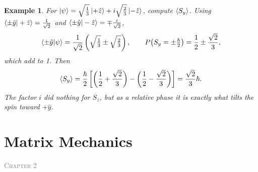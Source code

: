 \documentclass{article}
\newtheorem*{example}{Example}
\newcommand{\chapterstart}[1]{\noindent\hfill{\small\scshape\textcolor{gray}{Chapter #1}}\par}
\begin{document}
\begin{example}
    For $\ket{\psi} = \sqrt{\tfrac{1}{3}}\ket{+\hat{z}} + i\sqrt{\tfrac{2}{3}}\ket{-\hat{z}}$, compute $\braket{S_y}$. Using $\braket{\pm\hat{y}|+\hat{z}} = \tfrac{1}{\sqrt{2}}$ and $\braket{\pm\hat{y}|-\hat{z}} = \mp\tfrac{i}{\sqrt{2}}$,
    \[\braket{\pm\hat{y}|\psi} = \frac{1}{\sqrt{2}}\left(\sqrt{\tfrac{1}{3}} \pm \sqrt{\tfrac{2}{3}}\right), \qquad P\!\left(S_y = \pm\tfrac{\hbar}{2}\right) = \frac{1}{2} \pm \frac{\sqrt{2}}{3},\]
    which add to 1. Then
    \[\braket{S_y} = \frac{\hbar}{2}\left[\left(\frac{1}{2} + \frac{\sqrt{2}}{3}\right) - \left(\frac{1}{2} - \frac{\sqrt{2}}{3}\right)\right] = \frac{\sqrt{2}}{3}\hbar.\]
    The factor $i$ did nothing for $S_z$, but as a relative phase it is exactly what tilts the spin toward $+\hat{y}$.
\end{example}


\section{Matrix Mechanics}%
\chapterstart{2}
\end{document}
